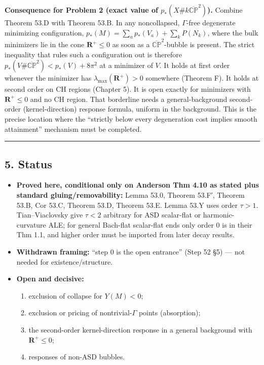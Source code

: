 \documentclass[
  10pt,
]{report}
\providecommand{\tightlist}{%
  \setlength{\itemsep}{0pt}\setlength{\parskip}{0pt}}
\begin{document}
\textbf{Consequence for Problem 2 (exact value of
\(p_*(X\#k\overline{\mathbb{CP}}^2)\)).} Combine Theorem 53.D with
Theorem 53.B. In any noncollapsed, \(\Gamma\)-free degenerate minimizing
configuration, \(p_*(M)=\sum_ap_*(V_a)+\sum_kP(N_k)\), where the bulk
minimizers lie in the cone \(\mathbf R^+\le0\) as soon as a
\(\overline{\mathbb{CP}}^2\)-bubble is present. The strict inequality
that rules such a configuration out is therefore
\(p_*(V\#\overline{\mathbb{CP}}^2)<p_*(V)+8\pi^2\) at a minimizer of
\(V\). It holds at first order whenever the minimizer has
\(\lambda_{\max}(\mathbf R^+)>0\) somewhere (Theorem F). It holds at
second order on CH regions (Chapter 5). It is open exactly for
minimizers with \(\mathbf R^+\le0\) and no CH region. That borderline
needs a general-background second-order (kernel-direction) response
formula, uniform in the background. This is the precise location where
the ``strictly below every degeneration cost implies smooth attainment''
mechanism must be completed.

\begin{center}\rule{0.5\linewidth}{0.5pt}\end{center}

\hypertarget{status}{%
\subsection{5. Status}\label{status}}

\begin{itemize}
\tightlist
\item
  \textbf{Proved here, conditional only on Anderson Thm 4.10 as stated
  plus standard gluing/removability:} Lemma 53.0, Theorem 53.F′, Theorem
  53.B, Cor 53.C, Theorem 53.D, Theorem 53.E. Lemma 53.Y uses order
  \(\tau>1\). Tian--Viaclovsky give \(\tau<2\) arbitrary for ASD
  scalar-flat or harmonic-curvature ALE; for general Bach-flat
  scalar-flat ends only order 0 is in their Thm 1.1, and higher order
  must be imported from later decay results.
\item
  \textbf{Withdrawn framing:} ``step 0 is the open entrance'' (Step 52
  §5) --- not needed for existence/structure.
\item
  \textbf{Open and decisive:}

  \begin{enumerate}
  \def\labelenumi{\arabic{enumi}.}
  \tightlist
  \item
    exclusion of collapse for \(Y(M)<0\);
  \item
    exclusion or pricing of nontrivial-\(\Gamma\) points (absorption);
  \item
    the second-order kernel-direction response in a general background
    with \(\mathbf R^+\le0\);
  \item
    responses of non-ASD bubbles.
  \end{enumerate}
\end{itemize}
\end{document}
